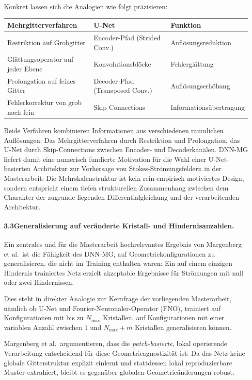 \documentclass[a4paper,12pt]{article}
\begin{document}
Konkret lassen sich die Analogien wie folgt präzisieren:
\begin{center}
\begin{tabular}{lll}
\toprule
\textbf{Mehrgitterverfahren} & \textbf{U-Net} & \textbf{Funktion} \\
\midrule
Restriktion auf Grobgitter & Encoder-Pfad (Strided Conv.) & Auflösungsreduktion \\
Glättungsoperator auf jeder Ebene & Konvolutionsblöcke & Fehlerglättung \\
Prolongation auf feines Gitter & Decoder-Pfad (Transposed Conv.) & Auflösungserhöhung \\
Fehlerkorrektur von grob nach fein & Skip Connections & Informationsübertragung \\
\bottomrule
\end{tabular}
\end{center}
Beide Verfahren kombinieren Informationen aus verschiedenen räumlichen
Auflösungen: Das Mehrgitterverfahren durch Restriktion und Prolongation,
das U-Net durch Skip-Connections zwischen Encoder- und Decoderkanälen.
DNN-MG liefert damit eine numerisch fundierte Motivation für die Wahl
einer U-Net-basierten Architektur zur Vorhersage von Stokes-Strömungsfeldern
in der Masterarbeit: Die Mehrskalenstruktur ist kein rein empirisch motiviertes
Design, sondern entspricht einem tiefen strukturellen Zusammenhang zwischen
dem Charakter der zugrunde liegenden Differentialgleichung und der
verarbeitenden Architektur.

\paragraph{3.3\quad Generalisierung auf veränderte Kristall- und Hindernisanzahlen.}

Ein zentrales und für die Masterarbeit hochrelevantes Ergebnis von
Margenberg et al.\ ist die Fähigkeit des DNN-MG, auf Geometriekonfigurationen
zu generalisieren, die nicht im Training enthalten waren: Ein auf einem
einzigen Hindernis trainiertes Netz erzielt akzeptable Ergebnisse
für Strömungen mit null oder zwei Hindernissen.

Dies steht in direkter Analogie zur Kernfrage der vorliegenden
Masterarbeit, nämlich ob U-Net und Fourier-Neuronaler-Operator (FNO),
trainiert auf Konfigurationen mit bis zu $N_\text{max}$ Kristallen,
auf Konfigurationen mit einer variablen Anzahl zwischen $1$ und
$N_\text{max} + m$ Kristallen generalisieren können.

Margenberg et al.\ argumentieren, dass die \emph{patch-basierte},
lokal operierende Verarbeitung entscheidend für diese
Geometrieagnostizität ist: Da das Netz keine globale Gitterstruktur
explizit einlernt und stattdessen lokal reproduzierbare Muster
extrahiert, bleibt es gegenüber globalen Geometrieänderungen robust.
\end{document}
